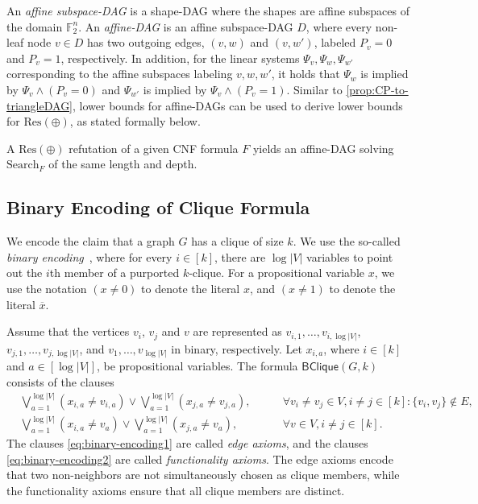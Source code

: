 \documentclass[10pt,a4paper]{article}
\theoremstyle{definition}
\theoremstyle{remark}
\theoremstyle{example}
\theoremstyle{plain}
\newcommand{\search}{\mathrm{Search}}
\newcommand{\setsize}[1]{\lvert#1\rvert}
\newcommand{\ResLin}{\textrm{Res}(\oplus)}
\newcommand{\binClique}[2]{\mathsf{BClique}({#1}, {#2})}
\newcommand{\binCliqueGk}{\binClique{G}{k}}
\newcommand{\F}{\mathbb{F}}
\begin{document}
An \emph{affine subspace-DAG} is a shape-DAG where the shapes are affine subspaces of the domain $\F_2^n$. An \emph{affine-DAG} is an affine subspace-DAG $D$, where  every non-leaf node $v\in D$ has two outgoing edges, $(v,w)$ and $(v,w')$, labeled $P_v=0$ and $P_v=1$, respectively. In addition, for the linear systems $\Psi_v,\Psi_w,\Psi_{w'}$ corresponding to the affine subspaces labeling $v,w,w'$, it holds that $\Psi_w$ is implied by $\Psi_v \land (P_v=0)$ and $\Psi_{w'}$ is implied by $\Psi_v \land (P_v=1)$. 
Similar to \autoref{prop:CP-to-triangleDAG}, lower bounds for affine-DAGs can be used to derive lower bounds for $\ResLin$, as stated formally below.
\begin{proposition}\label{prop:ResLin-to-affineDAG}
    A $\ResLin$ refutation of a given CNF formula $F$ yields an affine-DAG solving $\search_F$ of the same length and depth.
\end{proposition}

\subsection{Binary Encoding of Clique Formula}
\label{sec:bin-encoding}
We encode the claim that a graph $G$ has a clique of size $k$. We use the so-called \emph{binary encoding}~\cite{LPRT17ComplexityRamsey,DGGM24Binary}, where for every $i\in [k]$, there are $\log \setsize{V}$ variables to point out the $i$th member of a purported $k$-clique.
For a propositional variable $x$, we use the notation $(x \neq 0)$ to denote the literal $x$, and $(x \neq 1)$ to denote the literal $\overline{x}$.

Assume that the vertices $v_i$, $v_j$ and $v$ are represented as $v_{i,1}, \dots, v_{i, \log \setsize{V}}$, 
$v_{j,1}, \dots, v_{j, \log \setsize{V}}$, and
$v_{1}, \dots, v_{\log \setsize{V}}$ in binary, respectively.
Let $x_{i,a}$, where $i\in [k]$ and $a \in [\log \setsize{V}]$, be propositional variables. The formula $\binCliqueGk$ consists of the clauses
\begin{align}
    \label{eq:binary-encoding1}
    & \bigvee_{a=1}^{\log \setsize{V}} (x_{i,a}\neq v_{i,a}) \lor  \bigvee_{a=1}^{\log \setsize{V}} (x_{j,a}\neq v_{j,a}), 
    & \qquad \forall v_i\neq v_j\in V, i\neq j \in [k]: \{v_i,v_j\}\notin E, \\
    \label{eq:binary-encoding2}
    & \bigvee_{a=1}^{\log \setsize{V}} (x_{i,a}\neq v_{a}) \lor  \bigvee_{a=1}^{\log \setsize{V}} (x_{j,a}\neq v_{a}), 
    & \qquad \forall v\in V, i\neq j \in [k].
\end{align}
The clauses \eqref{eq:binary-encoding1} are called \emph{edge axioms}, and the clauses \eqref{eq:binary-encoding2} are called \emph{functionality axioms}.
The edge axioms encode that two non-neighbors are not simultaneously chosen as clique members, while the functionality axioms ensure that all clique members are distinct.
\end{document}
